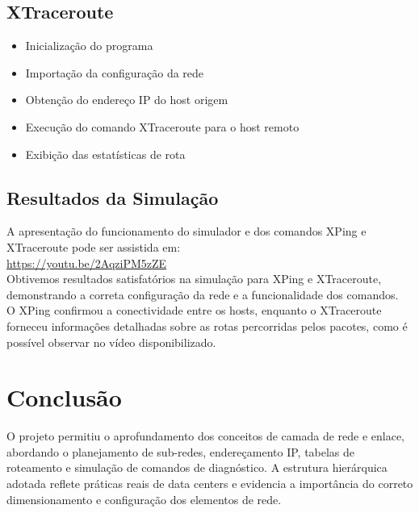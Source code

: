 \documentclass[conference,compsoc]{IEEEtran}
\begin{document}
\begin{otherlanguage}{brazil}
\subsection{XTraceroute}
\begin{itemize}
    \item Inicialização do programa
    \item Importação da configuração da rede
    \item Obtenção do endereço IP do host origem
    \item Execução do comando XTraceroute para o host remoto
    \item Exibição das estatísticas de rota
\end{itemize}

\subsection{Resultados da Simulação}

A apresentação do funcionamento do simulador e dos comandos XPing e XTraceroute pode ser assistida em: \\ 
\url{https://youtu.be/2AqziPM5zZE} \\
Obtivemos resultados satisfatórios na simulação para XPing e XTraceroute, demonstrando a correta configuração da rede e a funcionalidade dos comandos. \\
O XPing confirmou a conectividade entre os hosts, enquanto o XTraceroute forneceu informações detalhadas sobre as rotas percorridas pelos pacotes, como é possível observar no vídeo disponibilizado.

\section{Conclusão}

O projeto permitiu o aprofundamento dos conceitos de camada de rede e enlace, abordando o planejamento de sub-redes, endereçamento IP, tabelas de roteamento e simulação de comandos de diagnóstico. A estrutura hierárquica adotada reflete práticas reais de data centers e evidencia a importância do correto dimensionamento e configuração dos elementos de rede.



\end{otherlanguage}
\end{document}
